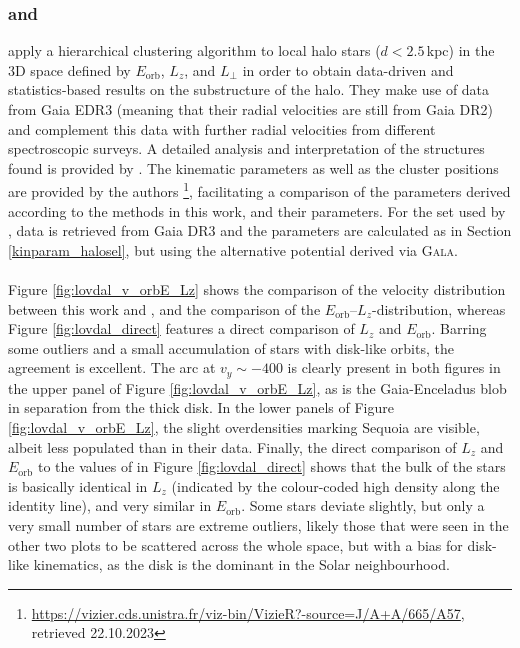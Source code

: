 \documentclass[a4paper,11pt]{article}
\begin{document}
\subsubsection*{\citet{lovdal22} and \citet{ruizlara22}}
\citet{lovdal22} apply a hierarchical clustering algorithm to local halo stars ($d<2.5$\,kpc) in the 3D space defined by $E_\mathrm{orb}$, $L_z$, and $L_\perp$ in order to obtain data-driven and statistics-based results on the substructure of the halo. They make use of data from Gaia EDR3 (meaning that their radial velocities are still from Gaia DR2) and complement this data with further radial velocities from different spectroscopic surveys. A detailed analysis and interpretation of the structures found is provided by \citet{ruizlara22}. The kinematic parameters as well as the cluster positions are provided by the authors \citep{lovdal22d}\footnote{\url{https://vizier.cds.unistra.fr/viz-bin/VizieR?-source=J/A+A/665/A57}, retrieved 22.10.2023}, facilitating a comparison of the parameters derived according to the methods in this work, and their parameters. For the set used by \citet{lovdal22}, data is retrieved from Gaia DR3 and the parameters are calculated as in Section \ref{kinparam_halosel}, but using the alternative potential derived via \textsc{Gala}.\\ \\
%
Figure \ref{fig:lovdal_v_orbE_Lz} shows the comparison of the velocity distribution between this work and \citet{lovdal22}, and the comparison of the $E_\mathrm{orb}$--$L_z$-distribution, whereas Figure \ref{fig:lovdal_direct} features a direct comparison of $L_z$ and $E_\mathrm{orb}$. Barring some outliers and a small accumulation of stars with disk-like orbits, the agreement is excellent. The arc at $v_y\sim-400$ is clearly present in both figures in the upper panel of Figure \ref{fig:lovdal_v_orbE_Lz}, as is the Gaia-Enceladus blob in separation from the thick disk. In the lower panels of Figure \ref{fig:lovdal_v_orbE_Lz}, the slight overdensities marking Sequoia are visible, albeit less populated than in their data. Finally, the direct comparison of $L_z$ and $E_\mathrm{orb}$ to the values of \citet{lovdal22} in Figure \ref{fig:lovdal_direct} shows that the bulk of the stars is basically identical in $L_z$ (indicated by the colour-coded high density along the identity line), and very similar in $E_\mathrm{orb}$. Some stars deviate slightly, but only a very small number of stars are extreme outliers, likely those that were seen in the other two plots to be scattered across the whole space, but with a bias for disk-like kinematics, as the disk is the dominant in the Solar neighbourhood.
\end{document}

